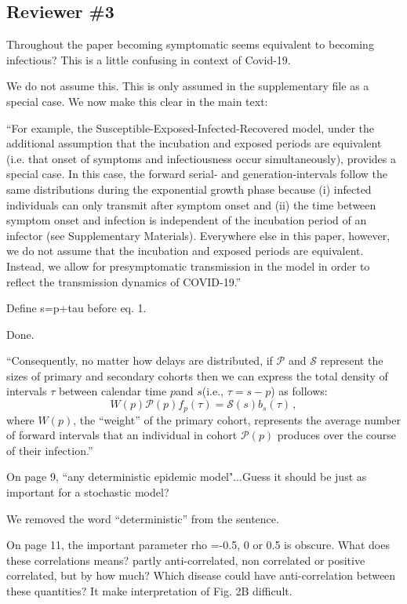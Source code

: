 \documentclass[12pt]{article}
\newcommand{\rev}{\subsection*}
\newcommand{\revtext}{\textsf}
\newcommand{\psymp}{\ensuremath{p}} %
\newcommand{\ssymp}{\ensuremath{s}} %
\newcommand{\psize}{{\mathcal P}} %
\newcommand{\ssize}{{\mathcal S}} %
\begin{document}
\rev{Reviewer \#3}

\revtext{Throughout the paper becoming symptomatic seems equivalent to becoming infectious? This is a little confusing in context of Covid-19.}

We do not assume this. This is only assumed in the supplementary file as a special case. We now make this clear in the main text:

``For example, the Susceptible-Exposed-Infected-Recovered model, under the additional assumption that the incubation and exposed periods are equivalent (i.e. that onset of symptoms and infectiousness occur simultaneously), provides a special case.
In this case, the forward serial- and generation-intervals follow the same distributions during the exponential growth phase because (i) infected individuals can only transmit after symptom onset and (ii) the time between symptom onset and infection is independent of the incubation period of an infector (see Supplementary Materials).
Everywhere else in this paper, however, we do not assume that the incubation and exposed periods are equivalent.
Instead, we allow for presymptomatic transmission in the model in order to reflect the transmission dynamics of COVID-19.''

\revtext{Define s=p+tau before eq. 1.}

Done.

``Consequently, no matter how delays are distributed, if
$\mathcal P$ and $\mathcal S$ represent the sizes of primary and
secondary cohorts then we can express the total density of intervals $\tau$ between calendar time \psymp and \ssymp (i.e., $\tau=\ssymp-\psymp$) as follows:
\begin{equation}
W(\psymp) \psize(\psymp) f_\psymp(\tau) = \ssize(\ssymp) b_\ssymp(\tau) \,,
\end{equation}
where $W(\psymp)$, the ``weight'' of the primary cohort, represents the average number of forward intervals that an individual in cohort $\psize(\psymp)$ produces over the course of their infection.''

\revtext{On page 9, ``any deterministic epidemic model"...Guess it should be just as important for a stochastic model?}

We removed the word ``deterministic'' from the sentence.

\revtext{On page 11, the important parameter rho =-0.5, 0 or 0.5 is obscure. What does these correlations means? partly anti-correlated, non correlated or positive correlated, but by how much? Which disease could have anti-correlation between these quantities? It make interpretation of Fig. 2B difficult. }
\end{document}
